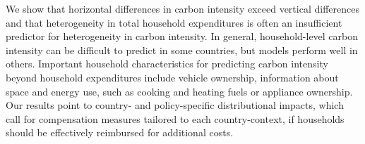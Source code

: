 \documentclass[12pt, a4paper]{article}
\begin{document}

We show that horizontal differences in carbon intensity exceed vertical differences and that heterogeneity in total household expenditures is often an insufficient predictor for heterogeneity in carbon intensity. In general, household-level carbon intensity can be difficult to predict in some countries, but models perform well in others. Important household characteristics for predicting carbon intensity beyond household expenditures include vehicle ownership, information about space and energy use, such as cooking and heating fuels or appliance ownership. Our results point to country- and policy-specific distributional impacts, which call for compensation measures tailored to each country-context, if households should be effectively reimbursed for additional costs. 
\end{document}
